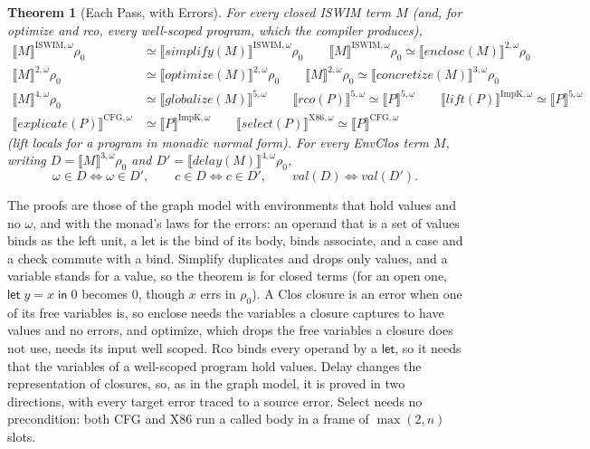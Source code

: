 \documentclass[10pt]{article}
\theoremstyle{acmplain}
\newtheorem{theorem}{Theorem}[section]
\newcommand{\SEM}[1]{\llbracket #1 \rrbracket}
\newcommand{\key}[1]{\mathsf{#1}}
\newcommand{\pass}[1]{\mathit{#1}}
\newcommand{\Let}{\key{let}\;}
\newcommand{\In}{\;\key{in}\;}
\begin{document}
\begin{theorem}[Each Pass, with Errors]
For every closed ISWIM term $M$ (and, for optimize and rco, every
well-scoped program, which the compiler produces),
\begin{align*}
  \SEM{M}^{\mathrm{ISWIM},\omega}\rho_0 &\simeq \SEM{\pass{simplify}(M)}^{\mathrm{ISWIM},\omega}\rho_0
  \qquad
  \SEM{M}^{\mathrm{ISWIM},\omega}\rho_0 \simeq \SEM{\pass{enclose}(M)}^{2,\omega}\rho_0 \\
  \SEM{M}^{2,\omega}\rho_0 &\simeq \SEM{\pass{optimize}(M)}^{2,\omega}\rho_0 \qquad
  \SEM{M}^{2,\omega}\rho_0 \simeq \SEM{\pass{concretize}(M)}^{3,\omega}\rho_0 \\
  \SEM{M}^{4,\omega}\rho_0 &\simeq \SEM{\pass{globalize}(M)}^{5,\omega} \qquad
  \SEM{\pass{rco}(P)}^{5,\omega} \simeq \SEM{P}^{5,\omega} \qquad
  \SEM{\pass{lift}(P)}^{\mathrm{ImpK},\omega} \simeq \SEM{P}^{5,\omega} \\
  \SEM{\pass{explicate}(P)}^{\mathrm{CFG},\omega} &\simeq \SEM{P}^{\mathrm{ImpK},\omega} \qquad
  \SEM{\pass{select}(P)}^{\mathrm{X86},\omega} \simeq \SEM{P}^{\mathrm{CFG},\omega}
\end{align*}
(lift locals for a program in monadic normal form). For every EnvClos
term $M$, writing $D = \SEM{M}^{3,\omega}\rho_0$ and
$D' = \SEM{\pass{delay}(M)}^{4,\omega}\rho_0$,
\[
  \omega \in D \iff \omega \in D', \qquad
  c \in D \iff c \in D', \qquad
  \mathit{val}(D) \iff \mathit{val}(D') .
\]
\end{theorem}
The proofs are those of the graph model with environments that hold
values and no $\omega$, and with the monad's laws for the errors: an
operand that is a set of values binds as the left unit, a let is the bind
of its body, binds associate, and a case and a check commute with a bind. Simplify duplicates and drops only values, and a
variable stands for a value, so the theorem is for closed terms (for an
open one, $\Let y = x \In 0$ becomes $0$, though $x$ errs in $\rho_0$).
A Clos closure is an error when one of its free variables is, so
enclose needs the variables a closure captures to have values and no
errors, and optimize, which drops the free variables a closure does not
use, needs its input well scoped. Rco binds every operand by a
$\key{let}$, so it needs that the variables of a well-scoped program
hold values. Delay changes the representation of closures, so, as in the
graph model, it is proved in two directions, with every target error
traced to a source error. Select needs no precondition: both CFG and
X86 run a called body in a frame of $\max(2, n)$ slots.
\end{document}
